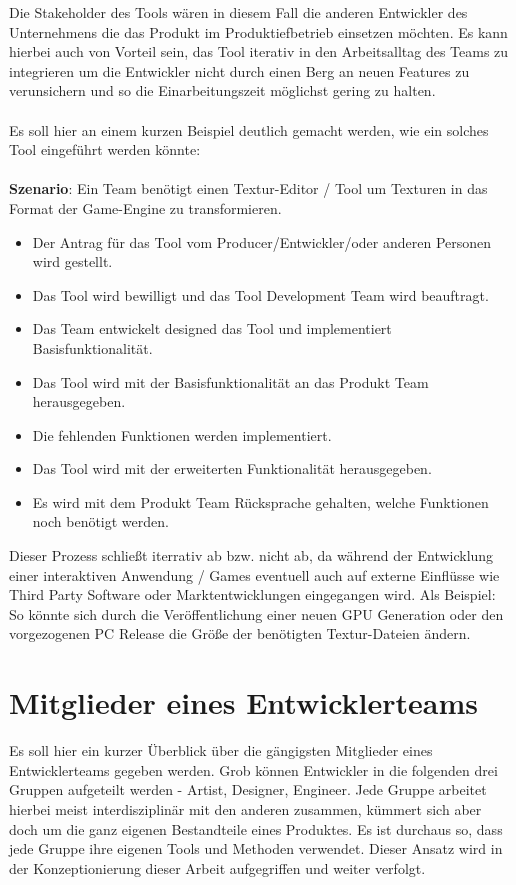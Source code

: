 \documentclass[pagesize, paper=a4, fontsize=12pt,titlepage=true, headings=small, headnosepline, abstractoff, liststotoc, nochapterprefix, plainheadsepline, twoside]{scrreprt}
\begin{document}
Die Stakeholder des Tools wären in diesem Fall die anderen Entwickler des Unternehmens die das Produkt im Produktiefbetrieb einsetzen möchten. Es kann hierbei auch von Vorteil sein, das Tool iterativ in den Arbeitsalltag des Teams zu integrieren um die Entwickler nicht durch einen Berg an neuen Features zu verunsichern und so die Einarbeitungszeit möglichst gering zu halten.
\\
\\
Es soll hier an einem kurzen Beispiel deutlich gemacht werden, wie ein solches Tool eingeführt werden könnte:
\\
\\
\textbf{Szenario}: Ein Team benötigt einen Textur-Editor / Tool um Texturen in das Format der Game-Engine zu transformieren.
\begin{itemize}
\item Der Antrag für das Tool vom Producer/Entwickler/oder anderen Personen wird gestellt.
\item Das Tool wird bewilligt und das Tool Development Team wird beauftragt.
\item Das Team entwickelt designed das Tool und implementiert Basisfunktionalität.
\item Das Tool wird mit der Basisfunktionalität an das Produkt Team herausgegeben.
\item Die fehlenden Funktionen werden implementiert.
\item Das Tool wird mit der erweiterten Funktionalität herausgegeben.
\item Es wird mit dem Produkt Team Rücksprache gehalten, welche Funktionen noch benötigt werden.
\end{itemize}
Dieser Prozess schließt iterrativ ab bzw. nicht ab, da während der Entwicklung einer interaktiven Anwendung / Games eventuell auch auf externe Einflüsse wie Third Party Software oder Marktentwicklungen eingegangen wird. Als Beispiel: So könnte sich durch die Veröffentlichung einer neuen GPU Generation oder den vorgezogenen PC Release die Größe der benötigten Textur-Dateien ändern.

\section{Mitglieder eines Entwicklerteams}
Es soll hier ein kurzer Überblick über die gängigsten Mitglieder eines Entwicklerteams gegeben werden. Grob können Entwickler in die folgenden drei Gruppen aufgeteilt werden - Artist, Designer, Engineer. Jede Gruppe arbeitet hierbei meist interdisziplinär mit den anderen zusammen, kümmert sich aber doch um die ganz eigenen Bestandteile eines Produktes. Es ist durchaus so, dass jede Gruppe ihre eigenen Tools und Methoden verwendet. Dieser Ansatz wird in der Konzeptionierung dieser Arbeit aufgegriffen und weiter verfolgt.
\end{document}
